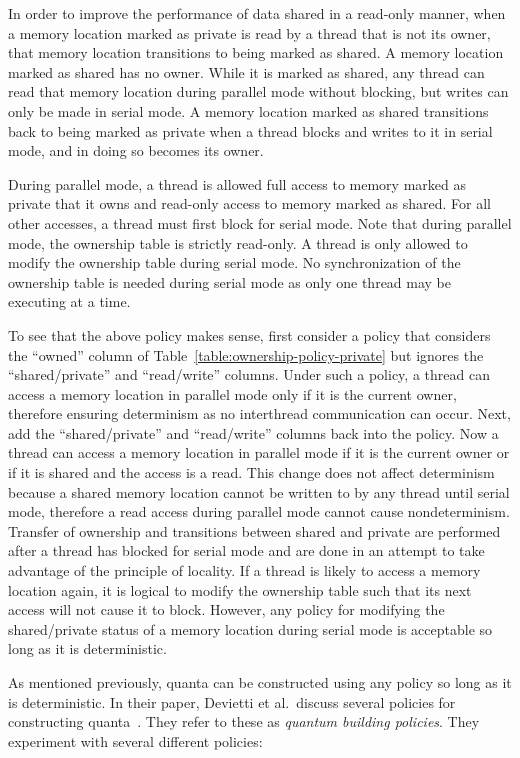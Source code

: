 In order to improve the performance of data shared in a read-only
manner, when a memory location marked as private is read by a thread
that is not its owner, that memory location transitions to being
marked as shared.  A memory location marked as shared has no owner.
While it is marked as shared, any thread can read that memory location
during parallel mode without blocking, but writes can only be made in
serial mode.  A memory location marked as shared transitions back to
being marked as private when a thread blocks and writes to it in
serial mode, and in doing so becomes its owner.

During parallel mode, a thread is allowed full access to memory marked
as private that it owns and read-only access to memory marked as
shared.  For all other accesses, a thread must first block for serial
mode.  Note that during parallel mode, the ownership table is strictly
read-only.  A thread is only allowed to modify the ownership table
during serial mode.  No synchronization of the ownership table is
needed during serial mode as only one thread may be executing at a
time.

To see that the above policy makes sense, first consider a policy that
considers the ``owned'' column of
Table~\ref{table:ownership-policy-private} but ignores the
``shared/private'' and ``read/write'' columns.  Under such a policy, a
thread can access a memory location in parallel mode only if it is the
current owner, therefore ensuring determinism as no interthread
communication can occur.  Next, add the ``shared/private'' and
``read/write'' columns back into the policy.  Now a thread can access
a memory location in parallel mode if it is the current owner or if it
is shared and the access is a read.  This change does not affect
determinism because a shared memory location cannot be written to by
any thread until serial mode, therefore a read access during parallel
mode cannot cause nondeterminism.  Transfer of ownership and
transitions between shared and private are performed after a thread
has blocked for serial mode and are done in an attempt to take
advantage of the principle of locality.  If a thread is likely to
access a memory location again, it is logical to modify the ownership
table such that its next access will not cause it to block.  However,
any policy for modifying the shared/private status of a memory
location during serial mode is acceptable so long as it is
deterministic.

As mentioned previously, quanta can be constructed using any policy so
long as it is deterministic.  In their paper, Devietti et al.\ discuss
several policies for constructing quanta~\cite{dmp}.  They refer to
these as \emph{quantum building policies}.  They experiment with
several different policies:

